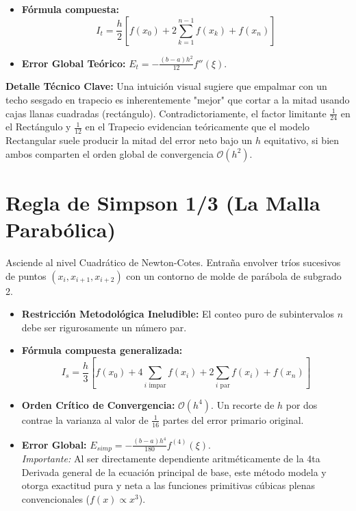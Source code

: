 \documentclass[12pt,a4paper]{article}
\begin{document}
\begin{itemize}
    \item \textbf{Fórmula compuesta:} 
    \begin{equation}
        I_t = \frac{h}{2} \left[ f(x_0) + 2\sum_{k=1}^{n-1} f(x_k) + f(x_n) \right]
    \end{equation}
    \item \textbf{Error Global Teórico:} $E_t = -\frac{(b-a)h^2}{12} f''(\xi)$.
\end{itemize}

\textbf{Detalle Técnico Clave:} Una intuición visual sugiere que empalmar con un techo sesgado en trapecio es inherentemente "mejor" que cortar a la mitad usando cajas llanas cuadradas (rectángulo). Contradictoriamente, el factor limitante $\frac{1}{24}$ en el Rectángulo y $\frac{1}{12}$ en el Trapecio evidencian teóricamente que el modelo Rectangular suele producir la mitad del error neto bajo un $h$ equitativo, si bien ambos comparten el orden global de convergencia $\mathcal{O}(h^2)$.

\section{Regla de Simpson 1/3 (La Malla Parabólica)}
Asciende al nivel Cuadrático de Newton-Cotes. Entraña envolver tríos sucesivos de puntos $(x_i, x_{i+1}, x_{i+2})$ con un contorno de molde de parábola de subgrado 2.
\begin{itemize}
    \item \textbf{Restricción Metodológica Ineludible:} El conteo puro de subintervalos $n$ debe ser rigurosamente un número par.
    \item \textbf{Fórmula compuesta generalizada:}
    \begin{equation}
        I_s = \frac{h}{3} \left[ f(x_0) + 4\sum_{i \text{ impar}} f(x_i) + 2\sum_{i \text{ par}} f(x_i) + f(x_n) \right]
    \end{equation}
    \item \textbf{Orden Crítico de Convergencia:} $\mathcal{O}(h^4)$. Un recorte de $h$ por dos contrae la varianza al valor de $\frac{1}{16}$ partes del error primario original. 
    \item \textbf{Error Global:} $E_{simp} = -\frac{(b-a)h^4}{180} f^{(4)}(\xi)$. \\
    \textit{Importante:} Al ser directamente dependiente aritméticamente de la 4ta Derivada general de la ecuación principal de base, este método modela y otorga exactitud pura y neta a las funciones primitivas cúbicas plenas convencionales ($f(x) \propto x^3$).
\end{itemize}
\end{document}
